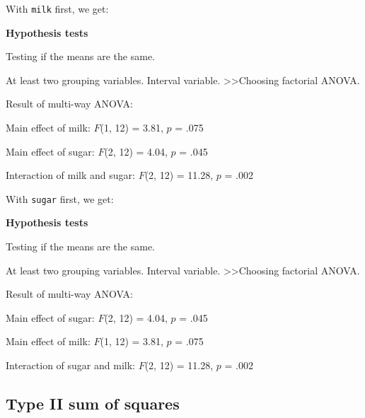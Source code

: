 \documentclass[
]{book}
\theoremstyle{definition}
\theoremstyle{definition}
\theoremstyle{definition}
\theoremstyle{definition}
\theoremstyle{remark}
\begin{document}
With \texttt{milk} first, we get:

\begin{tcolorbox}[colback=white,
  colframe=lightgray,
  coltext=black,
  boxsep=4pt,
  boxrule=0.3pt,
  arc=0pt]
  {   \sffamily
      \color{CSblue}\textbf{Hypothesis tests}
      
      \color{CSgreen}Testing if the means are the same.
      
      At least two grouping variables. Interval variable. \textgreater\textgreater Choosing factorial ANOVA.

      \color{black}
      Result of multi-way ANOVA:

      Main effect of milk: $F$(1, 12) = 3.81, $p$ = .075

      Main effect of sugar: $F$(2, 12) = 4.04, $p$ = .045

      Interaction of milk and sugar: $F$(2, 12) = 11.28, $p$ = .002
      \normalfont
  }
\end{tcolorbox}

With \texttt{sugar} first, we get:

\begin{tcolorbox}[colback=white,
  colframe=lightgray,
  coltext=black,
  boxsep=4pt,
  boxrule=0.3pt,
  arc=0pt]
  {   \sffamily
      \color{CSblue}\textbf{Hypothesis tests}
      
      \color{CSgreen}Testing if the means are the same.
      
      At least two grouping variables. Interval variable. \textgreater\textgreater Choosing factorial ANOVA.

      \color{black}
      Result of multi-way ANOVA:

      Main effect of sugar: $F$(2, 12) = 4.04, $p$ = .045

      Main effect of milk: $F$(1, 12) = 3.81, $p$ = .075

      Interaction of sugar and milk: $F$(2, 12) = 11.28, $p$ = .002
      \normalfont
  }
\end{tcolorbox}

\hypertarget{type-ii-sum-of-squares}{%
\subsection{Type II sum of squares}\label{type-ii-sum-of-squares}}
\end{document}
